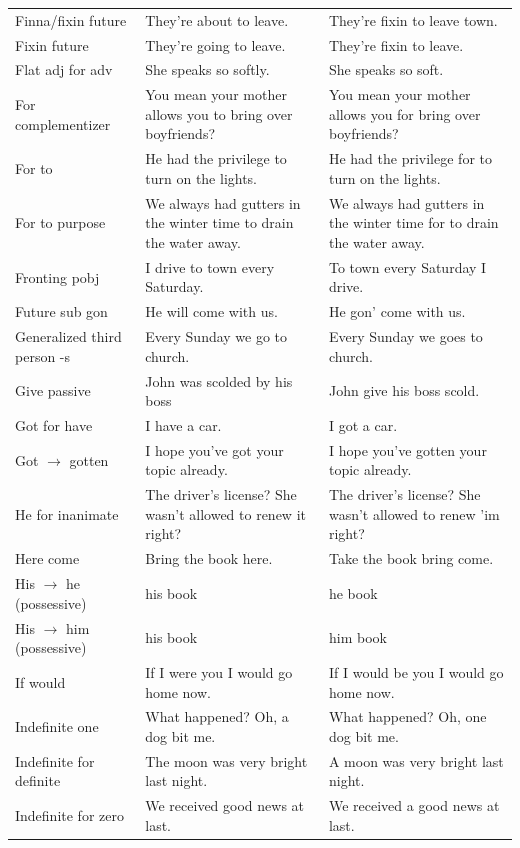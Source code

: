 \begin{longtable}{
  >{\raggedright\arraybackslash}p{3.2cm}
  >{\raggedright\arraybackslash}p{4.8cm}
  >{\raggedright\arraybackslash}p{4.8cm}
}
Finna/fixin future & They're about to leave. & They're fixin to leave town. \\
Fixin future & They're going to leave. & They're fixin to leave. \\
Flat adj for adv & She speaks so softly. & She speaks so soft. \\
For complementizer & You mean your mother allows you to bring over boyfriends? & You mean your mother allows you for bring over boyfriends? \\
For to & He had the privilege to turn on the lights. & He had the privilege for to turn on the lights. \\
For to purpose & We always had gutters in the winter time to drain the water away. & We always had gutters in the winter time for to drain the water away. \\
Fronting pobj & I drive to town every Saturday. & To town every Saturday I drive. \\
Future sub gon & He will come with us. & He gon' come with us. \\
Generalized third person -s & Every Sunday we go to church. & Every Sunday we goes to church. \\
Give passive & John was scolded by his boss & John give his boss scold. \\
Got for have & I have a car. & I got a car. \\
Got $\rightarrow$ gotten & I hope you've got your topic already. & I hope you've gotten your topic already. \\
He for inanimate & The driver's license? She wasn't allowed to renew it right? & The driver's license? She wasn't allowed to renew 'im right? \\
Here come & Bring the book here. & Take the book bring come. \\
His $\rightarrow$ he (possessive) & his book & he book \\
His $\rightarrow$ him (possessive) & his book & him book \\
If would & If I were you I would go home now. & If I would be you I would go home now. \\
Indefinite one & What happened? Oh, a dog bit me. & What happened? Oh, one dog bit me. \\
Indefinite for definite & The moon was very bright last night. & A moon was very bright last night. \\
Indefinite for zero & We received good news at last. & We received a good news at last. \\

\end{longtable}

